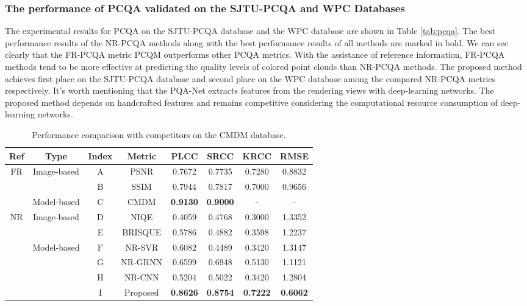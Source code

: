 \documentclass[lettersize,journal]{IEEEtran}
\begin{document}
\subsubsection{The performance of PCQA validated on the SJTU-PCQA and WPC Databases}
{ The experimental results for PCQA on the SJTU-PCQA database and the WPC database are shown in Table \ref{tab:pcqa}. The best performance results of the NR-PCQA methods along with the best performance results of all methods are marked in bold. We can see clearly that the FR-PCQA metric PCQM outperforms other PCQA metrics. With the assistance of reference information, FR-PCQA methods tend to be more effective at predicting the quality levels of colored point clouds than NR-PCQA methods. The proposed method achieves first place on the SJTU-PCQA database and second place on the WPC database among the compared NR-PCQA metrics respectively. It's worth mentioning that the PQA-Net extracts features from the rendering views with deep-learning networks. The proposed method depends on handcrafted features and remains competitive considering the computational resource consumption of deep-learning networks. 





\begin{table}[!t]
\setlength{\abovecaptionskip}{-5pt}
\renewcommand\arraystretch{1.5}
\renewcommand\tabcolsep{3.4pt}
  \caption{Performance comparison with competitors on the CMDM database.}
  \vspace{-0.05cm}
  \begin{center}
  \begin{tabular}{c|c|c|c|cccc}
    \toprule
    Ref & Type &Index & Metric & PLCC  &  SRCC & KRCC &RMSE\\
    \hline
    \multirow{3}{*}{FR} & \multirow{2}{*}{Image-based} 
    &A&PSNR & 0.7672 & 0.7735 & 0.7280 & 0.8832\\
&&B&SSIM & 0.7944 & 0.7817 &0.7000 & 0.9656\\
\cline{2-8} & \multirow{1}{*}{Model-based} 
    &C&CMDM & \textbf{0.9130} & \textbf{0.9000} & - & -\\
    \hline
    \multirow{6}{*}{NR}  & \multirow{2}{*}{Image-based} 
    &D&NIQE  &0.4059 & 0.4768 & 0.3000 & 1.3352\\
& &E&BRISQUE  & 0.5786 &0.4882 & 0.3598 & 1.2237\\
    \cline{2-8} & \multirow{4}{*}{Model-based} 
    &F&NR-SVR  &0.6082 & 0.4489 & 0.3420 & 1.3147\\
& &G&NR-GRNN  & 0.6599 & 0.6948 & 0.5130 & 1.1121\\
& &H&NR-CNN  &0.5204 & 0.5022 & 0.3420 & 1.2804\\
&  &I&Proposed  & \textbf{0.8626} & \textbf{0.8754} & \textbf{0.7222} & \textbf{0.6062}\\
    \bottomrule
  \end{tabular}
  \end{center}
  \label{tab:mqa}
  \vspace{-0.7cm}
\end{table}










}
\end{document}
